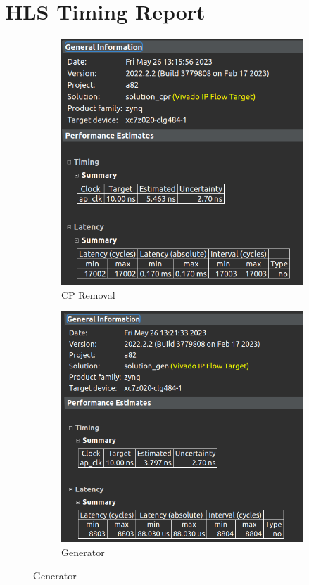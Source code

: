 \documentclass{article}
\begin{document}
\vspace{3cm}


\section{HLS Timing Report}
\vspace{1cm}
\begin{figure}[h]
\centering
\begin{subfigure}[b]{0.5\textwidth}
    \centering
\includegraphics[width=\textwidth]{figs/cpr2.png}
    \caption{CP Removal}
    \label{fig:my_label}
\end{subfigure}
\hfill
\begin{subfigure}[b]{0.5\textwidth}
    \centering
\includegraphics[width=\textwidth]{figs/gen2.png}
    \caption{Generator}
    \label{fig:my_label}
\end{subfigure}
\end{figure}
\end{document}
